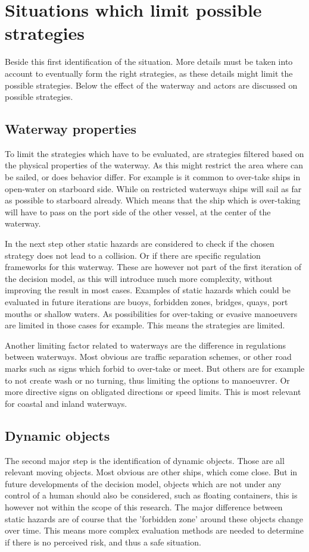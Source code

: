 \clearpage


\section{Situations which limit possible strategies}
Beside this first identification of the situation. More details must be taken into account to eventually form the right strategies, as these details might limit the possible strategies. Below the effect of the waterway and actors are discussed on possible strategies.

\subsection{Waterway properties}
To limit the strategies which have to be evaluated, are strategies filtered based on the physical properties of the waterway. As this might restrict the area where can be sailed, or does behavior differ. For example is it common to over-take ships in open-water on starboard side. While on restricted waterways ships will sail as far as possible to starboard already. Which means that the ship which is over-taking will have to pass on the port side of the other vessel, at the center of the waterway.

In the next step other static hazards are considered to check if the chosen strategy does not lead to a collision. Or if there are specific regulation frameworks for this waterway. These are however not part of the first iteration of the decision model, as this will introduce much more complexity, without improving the result in most cases. Examples of static hazards which could be evaluated in future iterations are buoys, forbidden zones, bridges, quays, port mouths or shallow waters. As possibilities for over-taking or evasive manoeuvers are limited in those cases for example. This means the strategies are limited.

Another limiting factor related to waterways are the difference in regulations between waterways. Most obvious are traffic separation schemes, or other road marks such as signs which forbid to over-take or meet. But others are for example to not create wash or no turning, thus limiting the options to manoeuvrer. Or more directive signs on obligated directions or speed limits. This is most relevant for coastal and inland waterways.

\subsection{Dynamic objects}
The second major step is the identification of dynamic objects. Those are all relevant moving objects. Most obvious are other ships, which come close. But in future developments of the decision model, objects which are not under any control of a human should also be considered, such as floating containers, this is however not within the scope of this research. The major difference between static hazards are of course that the 'forbidden zone' around these objects change over time. This means more complex evaluation methods are needed to determine if there is no perceived risk, and thus a safe situation.


